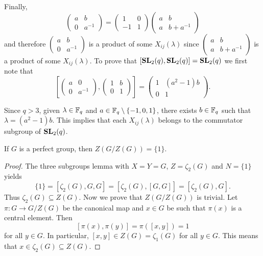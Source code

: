 Finally, 
\[
\begin{pmatrix}
	a&b\\
	0&a^{-1}
\end{pmatrix}
=\begin{pmatrix}
	1&0\\
	-1&1
\end{pmatrix}
\begin{pmatrix}
	a&b\\
	a&b+a^{-1}
\end{pmatrix}
\]
and therefore $\begin{pmatrix}
	a&b\\
	0&a^{-1}
\end{pmatrix}$ is a product of some $X_{ij}(\lambda)$ since
$\begin{pmatrix}
a&b\\
a&b+a^{-1}	
\end{pmatrix}$ 
is a product of some $X_{ij}(\lambda)$. 
To prove that $[\mathbf{SL}_2(q),\mathbf{SL}_2(q)]=\mathbf{SL}_2(q)$ we first 
note that
\[
\left[\begin{pmatrix}a&0\\0&a^{-1}\end{pmatrix},\begin{pmatrix}1&b\\0&1\end{pmatrix}\right]
=\begin{pmatrix}
1 & (a^2-1)b\\
0 & 1
\end{pmatrix}.
\]	

Since $q> 3$, given $\lambda\in\mathbb{F}_q$ and $a\in\mathbb{F}_q\setminus\{-1,0,1\}$, there exists
$b\in\mathbb{F}_q$ such that $\lambda=(a^2-1)b$. This implies that each $X_{ij}(\lambda)$ belongs to the
commutator subgroup of $\mathbf{SL}_2(q)$. 



\begin{theorem}[Gr\"un]
	\label{theorem:Grun}
	If $G$ is a perfect group, then $Z(G/Z(G))=\{1\}$. 
\end{theorem}

\begin{proof}
	The three subgroups lemma with $X=Y=G$, $Z=\zeta_2(G)$ and $N=\{1\}$ yields  
	\[
	\{1\}=[\zeta_2(G),G,G]=[\zeta_2(G),[G,G]]=[\zeta_2(G),G].
	\]
	Thus 	
	$\zeta_2(G)\subseteq Z(G)$. Now we prove that $Z(G/Z(G))$ is trivial. Let $\pi\colon G\to G/Z(G)$ be the canonical map
	and $x\in G$ be such that 
	$\pi(x)$ is a central element. Then 
	\[
	[\pi(x),\pi(y)]=\pi([x,y])=1
	\]
	for all $y\in G$. In particular, 
	$[x,y]\in Z(G)=\zeta_1(G)$ for all $y\in G$. This means that $x\in\zeta_2(G)\subseteq Z(G)$. 
\end{proof}






